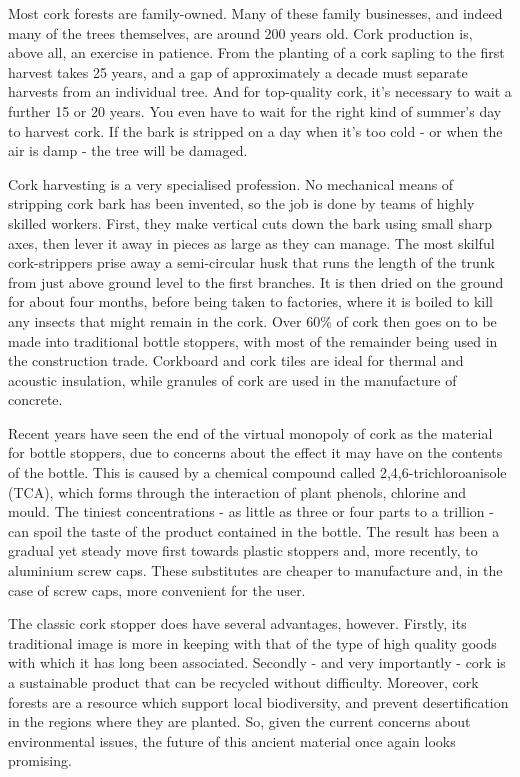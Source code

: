 \documentclass[conference]{IEEEtran}
\begin{document}
Most cork forests are family-owned. 
Many of these family businesses, and indeed many of the trees themselves, 
are around 200 years old. Cork production is, above all, an exercise in patience. 
From the planting of a cork sapling to the first harvest takes 25 years, 
and a gap of approximately a decade must separate harvests from an individual tree. 
And for top-quality cork, it's necessary to wait a further 15 or 20 years. 
You even have to wait for the right kind of summer's day to harvest cork. 
If the bark is stripped on a day when it's too cold - or when the air is damp 
- the tree will be damaged.

Cork harvesting is a very specialised profession. 
No mechanical means of stripping cork bark has been invented, 
so the job is done by teams of highly skilled workers. 
First, they make vertical cuts down the bark using small sharp axes, 
then lever it away in pieces as large as they can manage. 
The most skilful cork-strippers prise away a semi-circular husk that
 runs the length of the trunk from just above ground level to the first branches. 
 It is then dried on the ground for about four months, before being taken to factories, 
 where it is boiled to kill any insects that might remain in the cork. 
 Over 60\% of cork then goes on to be made into traditional bottle stoppers, 
 with most of the remainder being used in the construction trade. 
 Corkboard and cork tiles are ideal for thermal and acoustic insulation, 
 while granules of cork are used in the manufacture of concrete.

 Recent years have seen the end of the virtual monopoly of cork as the material for bottle stoppers, 
 due to concerns about the effect it may have on the contents of the bottle. 
 This is caused by a chemical compound called 2,4,6-trichloroanisole (TCA), 
 which forms through the interaction of plant phenols, chlorine and mould. 
 The tiniest concentrations - as little as three or four parts to a trillion - 
 can spoil the taste of the product contained in the bottle. 
 The result has been a gradual yet steady move first towards plastic stoppers and, 
 more recently, to aluminium screw caps. These substitutes are cheaper to manufacture and, 
 in the case of screw caps, more convenient for the user.

 The classic cork stopper does have several advantages, however. 
 Firstly, its traditional image is more in keeping with that of 
 the type of high quality goods with which it has long been associated. 
 Secondly - and very importantly - cork is a sustainable product that can be recycled without difficulty. 
 Moreover, cork forests are a resource which support local biodiversity, 
 and prevent desertification in the regions where they are planted. 
 So, given the current concerns about environmental issues, 
 the future of this ancient material once again looks promising.
\end{document}
